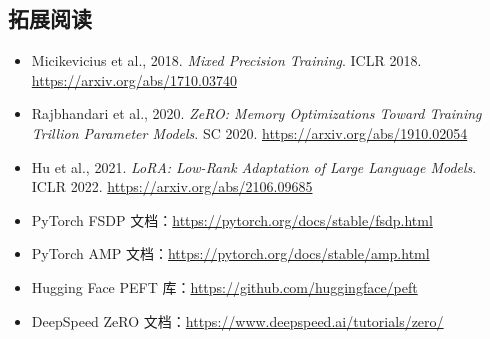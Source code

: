 \documentclass[a4paper]{article}
\begin{document}
\subsection{拓展阅读}

\begin{itemize}
    \item Micikevicius et al., 2018. \textit{Mixed Precision Training}. ICLR 2018. \url{https://arxiv.org/abs/1710.03740}
    \item Rajbhandari et al., 2020. \textit{ZeRO: Memory Optimizations Toward Training Trillion Parameter Models}. SC 2020. \url{https://arxiv.org/abs/1910.02054}
    \item Hu et al., 2021. \textit{LoRA: Low-Rank Adaptation of Large Language Models}. ICLR 2022. \url{https://arxiv.org/abs/2106.09685}
    \item PyTorch FSDP 文档：\url{https://pytorch.org/docs/stable/fsdp.html}
    \item PyTorch AMP 文档：\url{https://pytorch.org/docs/stable/amp.html}
    \item Hugging Face PEFT 库：\url{https://github.com/huggingface/peft}
    \item DeepSpeed ZeRO 文档：\url{https://www.deepspeed.ai/tutorials/zero/}
\end{itemize}
\end{document}
